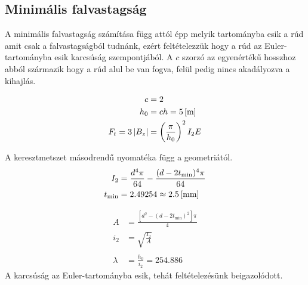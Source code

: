 \subsection{Minimális falvastagság}
A minimális falvastagság számítása függ attól épp melyik tartományba esik a rúd amit csak a falvastagságból tudnánk, ezért feltételezzük hogy a rúd az Euler-tartományba esik karcsúság szempontjából. A $c$ szorzó az egyenértékű hosszhoz abból származik hogy a rúd alul be van fogva, felül pedig nincs akadályozva a kihajlás.

\begin{align*}
	c &= 2 \\
	h_0 &= ch = \m{5} \\
	F_t = 3\left|B_z\right| &= \left(\frac{\pi}{h_0}\right)^2 I_2 E 
\end{align*}

A keresztmetszet másodrendű nyomatéka függ a geometriától.
\begin{align*}
	I_2 &= \frac{d^4 \pi}{64} - \frac{(d-2t_\text{min})^4 \pi}{64} \\
	t_\text{min} &= 2.49254 \approx \mm{2.5}
\end{align*}

\begin{align*}
	A &= \frac{\left[d^2 - (d-2t_\text{min})^2\right] \pi}{4} \\
	i_2 &= \sqrt{\frac{I_2}{A}} \\ \\
	\lambda &= \frac{h_0}{i_2} = 254.886
\end{align*}
A karcsúság az Euler-tartományba esik, tehát feltételezésünk beigazolódott.
